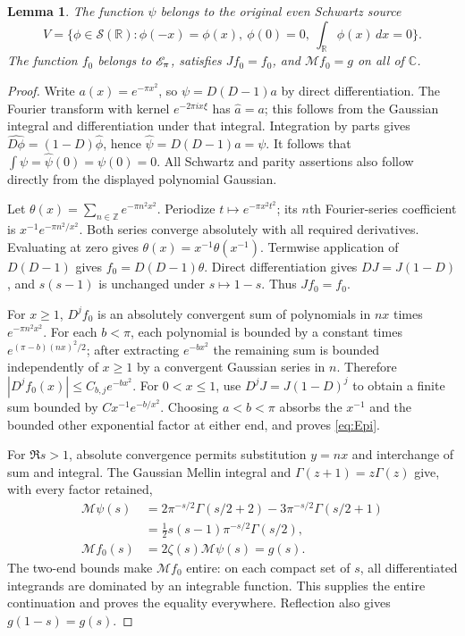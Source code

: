 \documentclass[11pt]{article}
\newcommand{\C}{\mathbb C}\newcommand{\R}{\mathbb R}
\newcommand{\Mell}{\mathcal M}\newcommand{\Sch}{\mathcal S}
\newtheorem{lemma}[theorem]{Lemma}
\begin{document}
\begin{lemma}\label{lem:theta-source}
The function $\psi$ belongs to the original even Schwartz source
\[
V=\{\phi\in\Sch(\R):\phi(-x)=\phi(x),\ \phi(0)=0,
\ \int_\R\phi(x)\,dx=0\}.
\]
The function $f_0$ belongs to $\mathscr E_\pi$, satisfies $Jf_0=f_0$, and
$\Mell f_0=g$ on all of $\C$.
\end{lemma}
\begin{proof}
Write $a(x)=e^{-\pi x^2}$, so $\psi=D(D-1)a$ by direct
differentiation. The Fourier transform with kernel $e^{-2\pi ix\xi}$
has $\widehat a=a$; this follows from the Gaussian integral and
differentiation under that integral. Integration by parts gives
$\widehat{D\phi}=(1-D)\widehat\phi$, hence
$\widehat\psi=D(D-1)a=\psi$. It follows that
$\int\psi=\widehat\psi(0)=\psi(0)=0$. All Schwartz and parity
assertions also follow directly from the displayed polynomial Gaussian.

Let $\theta(x)=\sum_{n\in\mathbb Z}e^{-\pi n^2x^2}$.
Periodize $t\mapsto e^{-\pi x^2t^2}$; its $n$th Fourier-series
coefficient is $x^{-1}e^{-\pi n^2/x^2}$. Both series converge
absolutely with all required derivatives. Evaluating at zero gives
$\theta(x)=x^{-1}\theta(x^{-1})$. Termwise application of
$D(D-1)$ gives $f_0=D(D-1)\theta$. Direct differentiation gives
$DJ=J(1-D)$, and $s(s-1)$ is unchanged under $s\mapsto1-s$.
Thus $Jf_0=f_0$.

For $x\geq1$, $D^jf_0$ is an absolutely convergent sum of
polynomials in $nx$ times $e^{-\pi n^2x^2}$. For each $b<\pi$,
each polynomial is bounded by a constant times
$e^{(\pi-b)(nx)^2/2}$; after extracting $e^{-bx^2}$ the
remaining sum is bounded independently of $x\geq1$ by a convergent
Gaussian series in $n$. Therefore $|D^jf_0(x)|\leq C_{b,j}e^{-bx^2}$.
For $0<x\leq1$, use $D^jJ=J(1-D)^j$ to obtain a finite sum
bounded by $Cx^{-1}e^{-b/x^2}$. Choosing $a<b<\pi$ absorbs
the $x^{-1}$ and the bounded other exponential factor at either end,
and proves \eqref{eq:Epi}.

For $\Re s>1$, absolute convergence permits substitution $y=nx$
and interchange of sum and integral. The Gaussian Mellin integral
and $\Gamma(z+1)=z\Gamma(z)$ give, with every factor retained,
\[
\begin{split}
\Mell\psi(s)
&=2\pi^{-s/2}\Gamma(s/2+2)-3\pi^{-s/2}\Gamma(s/2+1)\\
&=\tfrac12s(s-1)\pi^{-s/2}\Gamma(s/2),\\
\Mell f_0(s)&=2\zeta(s)\Mell\psi(s)=g(s).
\end{split}
\]
The two-end bounds make $\Mell f_0$ entire: on each compact
set of $s$, all differentiated integrands are dominated by an
integrable function. This supplies the entire continuation and proves
the equality everywhere. Reflection also gives $g(1-s)=g(s)$.
\end{proof}
\end{document}
